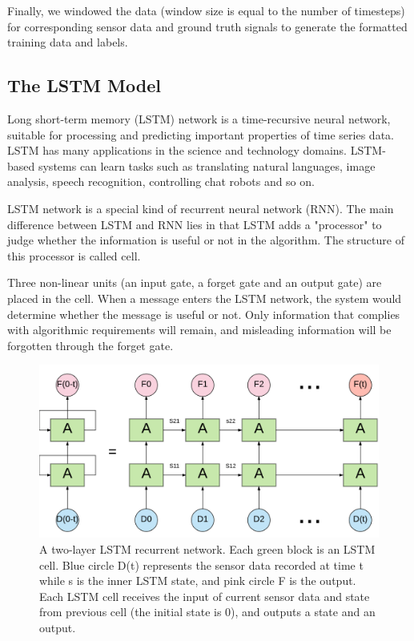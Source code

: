 \documentclass[11pt]{article}
\begin{document}
Finally, we windowed the data (window size is equal to the number of timesteps) for corresponding sensor data and ground truth signals to generate the formatted training data and labels.


\subsection{The LSTM Model}
Long short-term memory (LSTM) network is a time-recursive neural network, suitable for processing and predicting important properties of time series data. LSTM has many applications in the science and technology domains. LSTM-based systems can learn tasks such as translating natural languages, image analysis, speech recognition, controlling chat robots and so on.

LSTM network is a special kind of recurrent neural network (RNN). The main difference between LSTM and RNN lies in that LSTM adds a "processor" to judge whether the information is useful or not in the algorithm. The structure of this processor is called cell.

Three non-linear units (an input gate, a forget gate and an output gate) are placed in the cell. When a message enters the LSTM network, the system would determine whether the message is useful or not. Only information that complies with algorithmic requirements will remain, and misleading information will be forgotten through the forget gate.


\begin{figure}[ht]
\centering
\includegraphics[scale=0.3]{LSTM3}
\caption{A two-layer LSTM recurrent network. Each green block is an LSTM cell. Blue circle D(t) represents the sensor data recorded at time t while s is the inner LSTM state, and pink circle F is the output. Each LSTM cell receives the input of current sensor data and state from previous cell (the initial state is 0), and outputs a state and an output.}
\label{fig:LSTM}
\end{figure}
\end{document}

